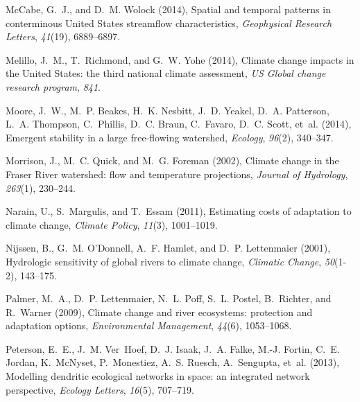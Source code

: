 \documentclass[9pt,twocolumn,twoside,lineno]{pnas-new}
\begin{document}
{{
McCabe, G.~J., and D.~M. Wolock (2014), Spatial and temporal patterns in
  conterminous {U}nited {S}tates streamflow characteristics,
  \textit{Geophysical Research Letters}, \textit{41}(19), 6889--6897.

Melillo, J.~M., T.~Richmond, and G.~W. Yohe (2014), Climate change impacts in
  the {U}nited {S}tates: the third national climate assessment, \textit{US
  Global change research program}, \textit{841}.

Moore, J.~W., M.~P. Beakes, H.~K. Nesbitt, J.~D. Yeakel, D.~A. Patterson, L.~A.
  Thompson, C.~Phillis, D.~C. Braun, C.~Favaro, D.~C. Scott, et~al. (2014),
  Emergent stability in a large free-flowing watershed, \textit{Ecology}, 
  \textit{96}(2), 340--347.

Morrison, J., M.~C. Quick, and M.~G. Foreman (2002), Climate change in the
  {F}raser {R}iver watershed: flow and temperature projections, \textit{Journal
  of Hydrology}, \textit{263}(1), 230--244.

Narain, U., S.~Margulis, and T.~Essam (2011), Estimating costs of adaptation to
  climate change, \textit{Climate Policy}, \textit{11}(3), 1001--1019.

Nijssen, B., G.~M. O'Donnell, A.~F. Hamlet, and D.~P. Lettenmaier (2001),
  Hydrologic sensitivity of global rivers to climate change, \textit{Climatic
  Change}, \textit{50}(1-2), 143--175.

Palmer, M.~A., D.~P. Lettenmaier, N.~L. Poff, S.~L. Postel, B.~Richter, and
  R.~Warner (2009), Climate change and river ecosystems: protection and
  adaptation options, \textit{Environmental Management}, \textit{44}(6),
  1053--1068.

Peterson, E.~E., J.~M. Ver~Hoef, D.~J. Isaak, J.~A. Falke, M.-J. Fortin, C.~E.
  Jordan, K.~McNyset, P.~Monestiez, A.~S. Ruesch, A.~Sengupta, et~al. (2013),
  Modelling dendritic ecological networks in space: an integrated network
  perspective, \textit{Ecology Letters}, \textit{16}(5), 707--719.

}}
\end{document}
